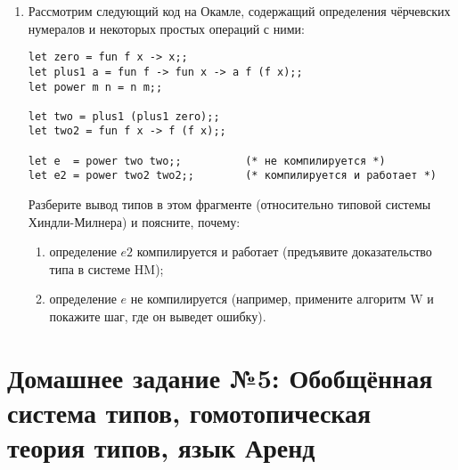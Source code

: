 \documentclass[10pt,a4paper,oneside]{article}
\begin{document}
\begin{enumerate}
\item Рассмотрим следующий код на Окамле, содержащий определения чёрчевских нумералов
и некоторых простых операций с ними:

\begin{verbatim}
let zero = fun f x -> x;;
let plus1 a = fun f -> fun x -> a f (f x);;
let power m n = n m;;

let two = plus1 (plus1 zero);;
let two2 = fun f x -> f (f x);;

let e  = power two two;;          (* не компилируется *)
let e2 = power two2 two2;;        (* компилируется и работает *)
\end{verbatim}

Разберите вывод типов в этом фрагменте (относительно типовой системы Хиндли-Милнера) и поясните, почему:
\begin{enumerate}
\item определение $e2$ компилируется и работает (предъявите доказательство типа в системе HM);
\item определение $e$ не компилируется (например, примените алгоритм W и покажите шаг, где он выведет ошибку).
\end{enumerate}

\end{enumerate}


\section*{Домашнее задание №5: Обобщённая система типов, гомотопическая теория типов, язык Аренд}
\end{document}
